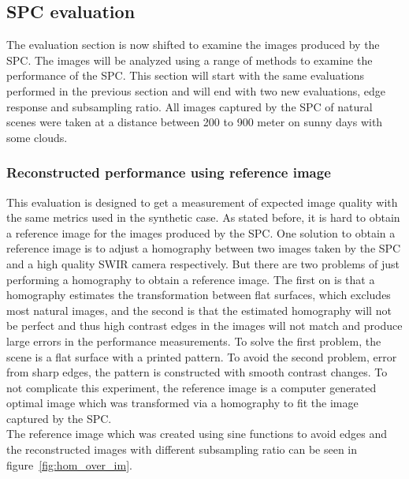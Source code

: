 

\subsection{SPC evaluation}
\label{sec:eval_spc}
The evaluation section is now shifted to examine the images produced by the SPC. The images will be analyzed using a range of methods to examine the performance of the SPC. This section will start with the same evaluations performed in the previous section and will end with two new evaluations, edge response and subsampling ratio. All images captured by the SPC of natural scenes were taken at a distance between 200 to 900 meter on sunny days with some clouds.


\subsubsection{Reconstructed performance using reference image}
This evaluation is designed to get a measurement of expected image quality with the same metrics used in the synthetic case. As stated before, it is hard to obtain a reference image for the images produced by the SPC. One solution to obtain a reference image is to adjust a homography between two images taken by the SPC and a high quality SWIR camera respectively. But there are two problems of just performing a homography to obtain a reference image. The first on is that a homography estimates the transformation between flat surfaces, which excludes most natural images, and the second is that the estimated homography will not be perfect and thus high contrast edges in the images will not match and produce large errors in the performance measurements. To solve the first problem, the scene is a flat surface with a printed pattern. To avoid the second problem, error from sharp edges, the pattern is constructed with smooth contrast changes. To not complicate this experiment, the reference image is a computer generated optimal image which was transformed via a homography to fit the image captured by the SPC.\\[0.1in] 

The reference image which was created using sine functions to avoid edges and the reconstructed images with different subsampling ratio can be seen in figure~\ref{fig:hom_over_im}.   


